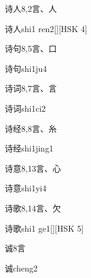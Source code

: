 \begin{entry}{诗人}{8,2}{⾔、⼈}
  \begin{phonetics}{诗人}{shi1 ren2}[][HSK 4]
  \end{phonetics}
\end{entry}

\begin{entry}{诗句}{8,5}{⾔、⼝}
  \begin{phonetics}{诗句}{shi1ju4}
  \end{phonetics}
\end{entry}

\begin{entry}{诗词}{8,7}{⾔、⾔}
  \begin{phonetics}{诗词}{shi1ci2}
  \end{phonetics}
\end{entry}

\begin{entry}{诗经}{8,8}{⾔、⽷}
  \begin{phonetics}{诗经}{shi1jing1}
  \end{phonetics}
\end{entry}

\begin{entry}{诗意}{8,13}{⾔、⼼}
  \begin{phonetics}{诗意}{shi1yi4}
  \end{phonetics}
\end{entry}

\begin{entry}{诗歌}{8,14}{⾔、⽋}
  \begin{phonetics}{诗歌}{shi1 ge1}[][HSK 5]
  \end{phonetics}
\end{entry}

\begin{entry}{诚}{8}{⾔}
  \begin{phonetics}{诚}{cheng2}
  \end{phonetics}
\end{entry}

